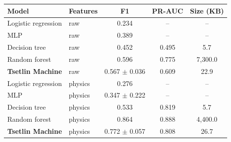 \begin{tabular}{llccc}
\toprule
Model & Features & F1 & PR-AUC & Size (KB) \\
\midrule
Logistic regression & raw & 0.234 & -- & -- \\
MLP & raw & 0.389 & -- & -- \\
Decision tree & raw & 0.452 & 0.495 & 5.7 \\
Random forest & raw & 0.596 & 0.775 & 7,300.0 \\
\textbf{Tsetlin Machine} & raw & 0.567 $\pm$ 0.036 & 0.609 & 22.9 \\
Logistic regression & physics & 0.276 & -- & -- \\
MLP & physics & 0.347 $\pm$ 0.222 & -- & -- \\
Decision tree & physics & 0.533 & 0.819 & 5.7 \\
Random forest & physics & 0.864 & 0.888 & 4,400.0 \\
\textbf{Tsetlin Machine} & physics & 0.772 $\pm$ 0.057 & 0.808 & 26.7 \\
\bottomrule
\end{tabular}